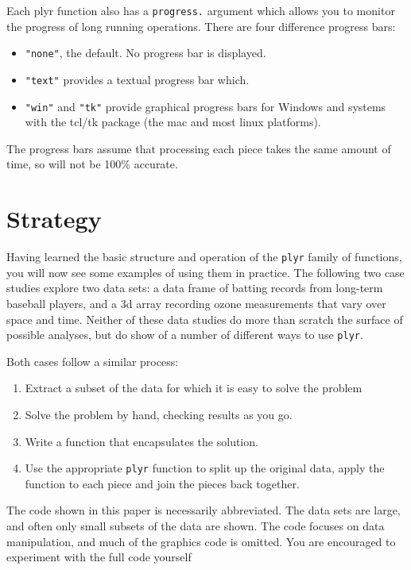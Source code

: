 \documentclass{scrartcl}
\newcommand{\plyr}{{\tt plyr}\xspace}
\begin{document}
Each plyr function also has a {\tt progress.} argument which allows you to monitor the progress of long running operations.  There are four difference progress bars:

\begin{itemize}
  \item {\tt "none"}, the default.  No progress bar is displayed.
  \item {\tt "text"} provides a textual progress bar which.
  \item {\tt "win"} and {\tt "tk"} provide graphical progress bars for Windows and systems with the tcl/tk package (the mac and most linux platforms).
\end{itemize}

The progress bars assume that processing each piece takes the same amount of time, so will not be 100\% accurate.

\section{Strategy}
\label{sec:strategy}

Having learned the basic structure and operation of the \plyr family of functions, you will now see some examples of using them in practice.  The following two case studies explore two data sets: a data frame of batting records from long-term baseball players, and a 3d array recording ozone measurements that vary over space and time.  Neither of these data studies do more than scratch the surface of possible analyses, but do show of a number of different ways to use \plyr.

Both cases follow a similar process:

\begin{enumerate}
  \item Extract a subset of the data for which it is easy to solve the problem

  \item Solve the problem by hand, checking results as you go.

  \item Write a function that encapsulates the solution.

  \item Use the appropriate \plyr function to split up the original data, apply the function to each piece and join the pieces back together.
  
\end{enumerate}

The code shown in this paper is necessarily abbreviated.  The data sets are large, and often only small subsets of the data are shown.  The code focuses on data manipulation, and much of the graphics code is omitted.  You are encouraged to experiment with the full code yourself
\end{document}

